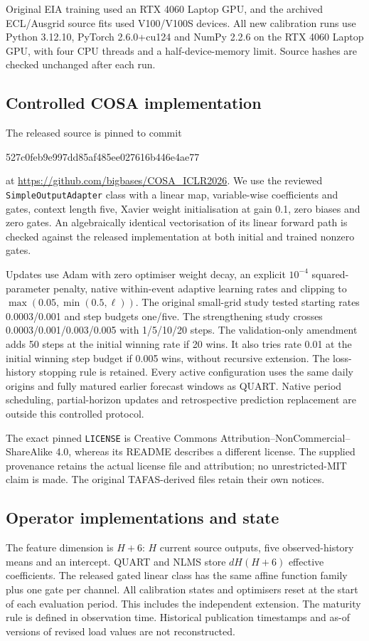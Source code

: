 \documentclass[11pt,a4paper]{article}
\begin{document}
Original EIA training used an RTX 4060 Laptop GPU, and the archived ECL/Ausgrid source fits used V100/V100S devices. All new calibration runs use Python 3.12.10, PyTorch 2.6.0+cu124 and NumPy 2.2.6 on the RTX 4060 Laptop GPU, with four CPU threads and a half-device-memory limit. Source hashes are checked unchanged after each run.

\subsection{Controlled COSA implementation}
The released source is pinned to commit\par\smallskip
{\footnotesize\ttfamily 527c0feb9e997dd85af485ee027616b446e4ae77}\par\smallskip
at \url{https://github.com/bigbases/COSA_ICLR2026}. We use the reviewed \texttt{SimpleOutputAdapter} class with a linear map, variable-wise coefficients and gates, context length five, Xavier weight initialisation at gain 0.1, zero biases and zero gates. An algebraically identical vectorisation of its linear forward path is checked against the released implementation at both initial and trained nonzero gates.

Updates use Adam with zero optimiser weight decay, an explicit $10^{-4}$ squared-parameter penalty, native within-event adaptive learning rates and clipping to $\max(0.05,\min(0.5,\ell))$. The original small-grid study tested starting rates 0.0003/0.001 and step budgets one/five. The strengthening study crosses 0.0003/0.001/0.003/0.005 with 1/5/10/20 steps. The validation-only amendment adds 50 steps at the initial winning rate if 20 wins. It also tries rate 0.01 at the initial winning step budget if 0.005 wins, without recursive extension. The loss-history stopping rule is retained. Every active configuration uses the same daily origins and fully matured earlier forecast windows as QUART. Native period scheduling, partial-horizon updates and retrospective prediction replacement are outside this controlled protocol.

The exact pinned \texttt{LICENSE} is Creative Commons Attribution--NonCommercial--ShareAlike 4.0, whereas its README describes a different license. The supplied provenance retains the actual license file and attribution; no unrestricted-MIT claim is made. The original TAFAS-derived files retain their own notices.

\subsection{Operator implementations and state}
The feature dimension is $H+6$: $H$ current source outputs, five observed-history means and an intercept. QUART and NLMS store $dH(H+6)$ effective coefficients. The released gated linear class has the same affine function family plus one gate per channel. All calibration states and optimisers reset at the start of each evaluation period. This includes the independent extension. The maturity rule is defined in observation time. Historical publication timestamps and as-of versions of revised load values are not reconstructed.
\end{document}
